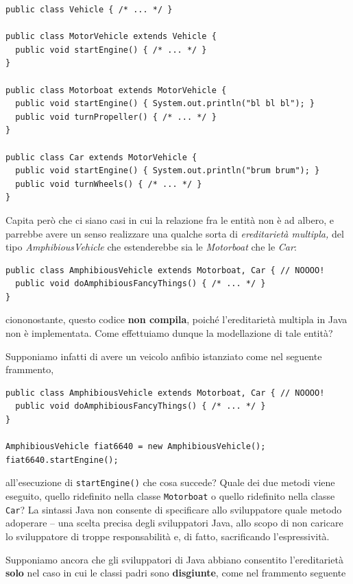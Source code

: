 \documentclass[\fontsizeclass,twocolumn]{\classname}
\theoremstyle{definition}
\theoremstyle{definition}
\begin{document}
\begin{lstlisting}
public class Vehicle { /* ... */ }

public class MotorVehicle extends Vehicle {
  public void startEngine() { /* ... */ }
}

public class Motorboat extends MotorVehicle {
  public void startEngine() { System.out.println("bl bl bl"); }
  public void turnPropeller() { /* ... */ }
}

public class Car extends MotorVehicle {
  public void startEngine() { System.out.println("brum brum"); }
  public void turnWheels() { /* ... */ }
}
\end{lstlisting}

Capita però che ci siano casi in cui la relazione fra le entità non è ad
albero, e parrebbe avere un senso realizzare una qualche sorta di \emph{ereditarietà
multipla,} del tipo \emph{AmphibiousVehicle} che estenderebbe sia le \emph{Motorboat} che le \emph{Car}:

\begin{lstlisting}
public class AmphibiousVehicle extends Motorboat, Car { // NOOOO!
  public void doAmphibiousFancyThings() { /* ... */ }
}
\end{lstlisting}

ciononostante, questo codice \textbf{non compila}, poiché l'ereditarietà
multipla in Java non è implementata. Come effettuiamo dunque la modellazione di
tale entità?

Supponiamo infatti di avere un veicolo anfibio istanziato come nel seguente
frammento,

\begin{lstlisting}
public class AmphibiousVehicle extends Motorboat, Car { // NOOOO!
  public void doAmphibiousFancyThings() { /* ... */ }
}

AmphibiousVehicle fiat6640 = new AmphibiousVehicle();
fiat6640.startEngine();
\end{lstlisting}

all'esecuzione di \texttt{startEngine()} che cosa succede? Quale dei due metodi
viene eseguito, quello ridefinito nella classe \texttt{Motorboat} o quello
ridefinito nella classe \texttt{Car}? La sintassi Java non consente di
specificare allo sviluppatore quale metodo adoperare \--- una scelta precisa
degli sviluppatori Java, allo scopo di non caricare lo sviluppatore di troppe
responsabilità e, di fatto, sacrificando l'espressività.

Supponiamo ancora che gli sviluppatori di Java abbiano consentito l'ereditarietà \textbf{solo} nel caso in cui le classi padri sono \textbf{disgiunte}, come nel frammento seguente
\end{document}

